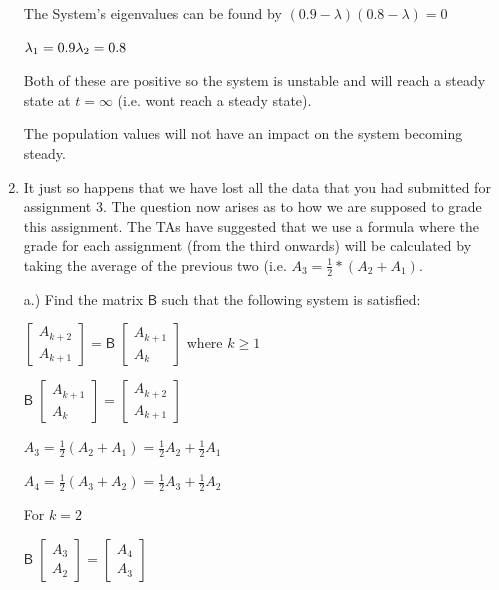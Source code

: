 \documentclass[answers, a4paper, 11pt]{exam}
\newcommand{\mat}[1]{\boldsymbol { \mathsf{#1}} }
\begin{document}
\begin{enumerate}
\begin{solution}
    The System's eigenvalues can be found by $(0.9 - \lambda)(0.8 - \lambda) = 0$ 
    
    $\lambda_1 = 0.9 \\ \lambda_2 = 0.8$
    
    Both of these are positive so the system is unstable and will reach a steady state at $t = \infty$ (i.e. wont reach a steady state). 
    
    The population values will not have an impact on the system becoming steady. 
\end{solution}


\item It just so happens that we have lost all the data that you had submitted for assignment 3. The question now arises as to how we are supposed to grade this assignment. The TAs have suggested that we use a formula where the grade for each assignment (from the third onwards) will be calculated by taking the average of the previous two (i.e. $A_3 = \frac{1}{2}*(A_2+A_1) $.  


a.) Find the matrix $\mat{B}$ such that the following system is satisfied:

$
\begin{bmatrix}
A_{k+2}\\
A_{k+1}
\end{bmatrix} = \mat{B} \;
\begin{bmatrix}
A_{k+1}\\
A_{k}
\end{bmatrix}
$
where $k \geq 1$ 
\newline

\begin{solution}

    $
\mat{B} \;
\begin{bmatrix}
A_{k+1}\\
A_{k}
\end{bmatrix} = 
\begin{bmatrix}
A_{k+2}\\
A_{k+1}
\end{bmatrix}
$

$A_3 = \frac{1}{2} (A_2 + A_1) 
= \frac{1}{2} A_2 + \frac{1}{2} A_1$

$A_4 = \frac{1}{2} (A_3 + A_2) 
= \frac{1}{2} A_3 + \frac{1}{2} A_2$

For $k = 2$

    $
\mat{B} \;
\begin{bmatrix}
A_3\\
A_{2}
\end{bmatrix} = 
\begin{bmatrix}
A_{4}\\
A_{3}
\end{bmatrix}
$


\end{solution}
\end{enumerate}
\end{document}
